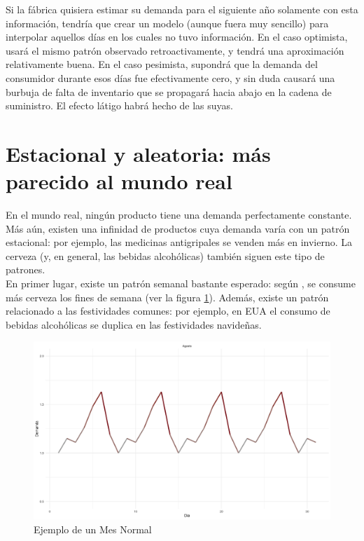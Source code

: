 Si la f\'abrica quisiera estimar su demanda para el siguiente a\~no solamente con esta informaci\'on, tendr\'ia que crear un modelo (aunque fuera muy sencillo) para interpolar aquellos d\'ias en los cuales no tuvo informaci\'on. En el caso optimista, usar\'a el mismo patr\'on observado retroactivamente, y tendr\'a una aproximaci\'on relativamente buena. En el caso pesimista, supondr\'a que la demanda del consumidor durante esos d\'ias fue efectivamente cero, y sin duda causar\'a una burbuja de falta de inventario que se propagar\'a hacia abajo en la cadena de suministro. El efecto l\'atigo habr\'a hecho de las suyas.\\

\section{Estacional y aleatoria: m\'as parecido al mundo real}

En el mundo real, ning\'un producto tiene una demanda perfectamente constante. M\'as a\'un, existen una infinidad de productos cuya demanda var\'ia con un patr\'on estacional: por ejemplo, las medicinas antigripales se venden m\'as en invierno. La cerveza (y, en general, las bebidas alcoh\'olicas) tambi\'en siguen este tipo de patrones.\\

En primer lugar, existe un patr\'on semanal bastante esperado: seg\'un \citet{gallupbeer}, se consume m\'as cerveza los fines de semana (ver la figura \ref{weekly_base}). Adem\'as, existe un patr\'on relacionado a las festividades comunes: por ejemplo, en EUA el consumo de bebidas alcoh\'olicas se duplica en las festividades navide\~nas. \\

\begin{figure}[ht!]
\caption{Ejemplo de un Mes Normal}
\label{weekly_base}
\includegraphics[width=12cm]{tesis_tex/figs/monthly_customer_demand_ggplot.png}
\centering
\end{figure}

